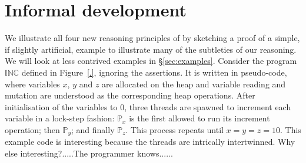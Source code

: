 \section{Informal development}
\label{sec:intuition}

We illustrate  all four new reasoning principles of \colosl by
sketching a proof of a simple, if slightly artificial,  example to
illustrate many of the subtleties of our  reasoning. 
We will look at less contrived examples in
\S\ref{sec:examples}. Consider the program $\mathbb{INC}$ defined
in Figure~\ref{.}, ignoring the assertions. It is written in pseudo-code, where variables $x$, $y$ and $z$ are allocated
on the heap and variable reading and mutation are understood as the
corresponding heap operations. After initialisation of the variables
to $0$, three threads are spawned to increment each variable in a
lock-step fashion: $\mathbb{P}_x$ is the first allowed to run its
increment operation; then $\mathbb{P}_y$;  and finally
$\mathbb{P}_z$. This process repeats until $x = y = z = 10$.
This example code is interesting because the threads are intrically
intertwinned. Why else interesting?.....The programmer knows......




